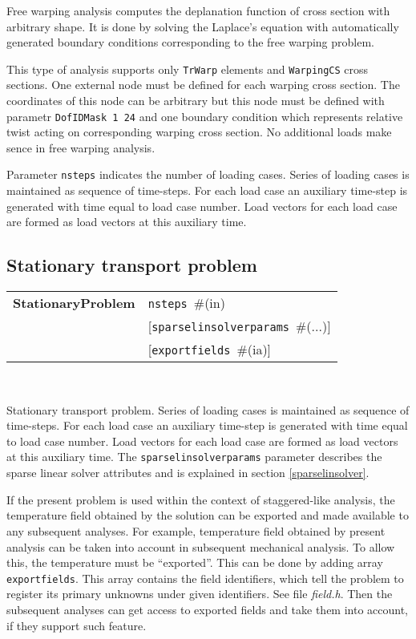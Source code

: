 \documentclass[a4paper]{article}
\newcommand{\param}[1]{\texttt{#1}} %
\newcommand{\optional}[1]{[#1]} %
\newcommand{\field}[2]{\param{#1}~\#{\tiny(#2)}} %
\newcommand{\optField}[2]{\optional{\field{#1}{#2}}}
\newcommand{\entKeywordInst}[1]{\textbf{#1}} %
\newenvironment{record}[1][]{\begin{tabular}{|ll}}{\end{tabular}\\}
\newcommand{\recentry}[2]{{#1}&{#2}\\}
\newcounter{rcc}
\newenvironment{record}[1][\textwidth]{\setcounter{rcc}{0}\rowcolors{1}{lightgray}{lightgray}\tabularx{#1}{llR} \hline}
               {\endtabularx}
\newcommand{\recentry}[2]{\ifthenelse{\value{rcc}>0}{$\backslash$ \\}{\setcounter{rcc}{1}}{#1}&{#2}&}
\begin{document}
Free warping analysis computes the deplanation function of cross section with arbitrary shape. It is done by solving the Laplace's equation with automatically generated boundary conditions corresponding to the free warping problem.

This type of analysis supports only \param{TrWarp} elements and \param{WarpingCS} cross sections. One external node must be defined for each warping cross section. The coordinates of this node can be arbitrary but this node must be defined with parametr  \param{DofIDMask 1 24} and one boundary condition which represents relative twist acting on corresponding warping cross section. No additional loads make sence in free warping analysis.

Parameter \param{nsteps} indicates the number of loading cases.
Series of loading cases is maintained as sequence of time-steps.
For each load case an auxiliary time-step is generated with time
equal to load case number.
Load vectors for each load case are formed as load vectors at
this auxiliary time.


\subsection{Stationary transport problem}
\label{StationaryTransport}

\begin{record}
  \recentry{\entKeywordInst{StationaryProblem}}{\field{nsteps}{in}}
  \recentry{}{\optField{sparselinsolverparams}{...}}
  \recentry{}{\optField{exportfields}{ia}}
\end{record}

Stationary transport problem.
Series of loading cases is maintained as sequence of time-steps.
For each load case an auxiliary time-step is generated with time
equal to load case number.
Load vectors for each load case are formed as load vectors at
this auxiliary time.
The  \param{sparselinsolverparams} parameter describes the sparse
linear solver attributes and is explained in section \ref{sparselinsolver}.

If the present problem is used within the context
of staggered-like analysis, the temperature field obtained by the
solution can be exported and made available to any subsequent
analyses. For example, temperature field obtained by present analysis
can be taken into account in subsequent mechanical analysis.
To allow this, the temperature must be ``exported''. This can be done
by adding array \param{exportfields}. This array contains the field
identifiers, which tell the problem to register its primary unknowns
under given identifiers. See file {\it field.h}.
Then the subsequent analyses can get access to exported fields 
and take them into account, if they support such feature.
\end{document}
